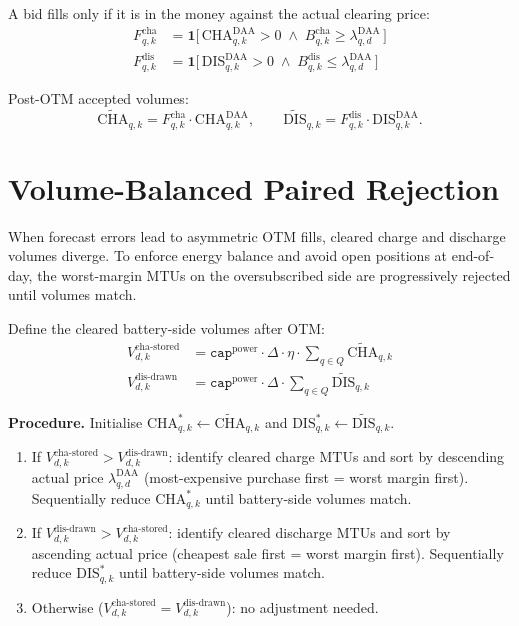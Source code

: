 \documentclass{article}
\numberwithin{equation}{subsection}
\begin{document}
A bid fills only if it is in the money against the actual clearing price:
\begin{align}
F^{\text{cha}}_{q,k} &= \mathbf{1}\bigl[\,\mathrm{CHA}^{\mathrm{DAA}}_{q,k} > 0 \;\wedge\; B^{\text{cha}}_{q,k} \geq \lambda^{\text{DAA}}_{q,d}\,\bigr] \\
F^{\text{dis}}_{q,k} &= \mathbf{1}\bigl[\,\mathrm{DIS}^{\mathrm{DAA}}_{q,k} > 0 \;\wedge\; B^{\text{dis}}_{q,k} \leq \lambda^{\text{DAA}}_{q,d}\,\bigr]
\end{align}

Post-OTM accepted volumes:
\begin{equation}
\widetilde{\mathrm{CHA}}_{q,k} = F^{\text{cha}}_{q,k} \cdot \mathrm{CHA}^{\mathrm{DAA}}_{q,k},
\qquad
\widetilde{\mathrm{DIS}}_{q,k} = F^{\text{dis}}_{q,k} \cdot \mathrm{DIS}^{\mathrm{DAA}}_{q,k}.
\end{equation}


\section{Volume-Balanced Paired Rejection}

When forecast errors lead to asymmetric OTM fills, cleared charge and discharge volumes diverge. To enforce energy balance and avoid open positions at end-of-day, the worst-margin MTUs on the oversubscribed side are progressively rejected until volumes match.

Define the cleared battery-side volumes after OTM:
\begin{align}
V^{\text{cha-stored}}_{d,k} &= \texttt{cap}^{\text{power}} \cdot \Delta \cdot \eta \cdot \sum_{q\in Q} \widetilde{\mathrm{CHA}}_{q,k} \\
V^{\text{dis-drawn}}_{d,k} &= \texttt{cap}^{\text{power}} \cdot \Delta \cdot \sum_{q\in Q} \widetilde{\mathrm{DIS}}_{q,k}
\end{align}

\textbf{Procedure.} Initialise \(\mathrm{CHA}^{*}_{q,k} \leftarrow \widetilde{\mathrm{CHA}}_{q,k}\) and \(\mathrm{DIS}^{*}_{q,k} \leftarrow \widetilde{\mathrm{DIS}}_{q,k}\).

\begin{enumerate}[itemsep=2pt, topsep=4pt]
    \item If \(V^{\text{cha-stored}}_{d,k} > V^{\text{dis-drawn}}_{d,k}\): identify cleared charge MTUs and sort by descending actual price \(\lambda^{\mathrm{DAA}}_{q,d}\) (most-expensive purchase first = worst margin first). Sequentially reduce \(\mathrm{CHA}^{*}_{q,k}\) until battery-side volumes match.
    \item If \(V^{\text{dis-drawn}}_{d,k} > V^{\text{cha-stored}}_{d,k}\): identify cleared discharge MTUs and sort by ascending actual price (cheapest sale first = worst margin first). Sequentially reduce \(\mathrm{DIS}^{*}_{q,k}\) until battery-side volumes match.
    \item Otherwise (\(V^{\text{cha-stored}}_{d,k} = V^{\text{dis-drawn}}_{d,k}\)): no adjustment needed.
\end{enumerate}
\end{document}
